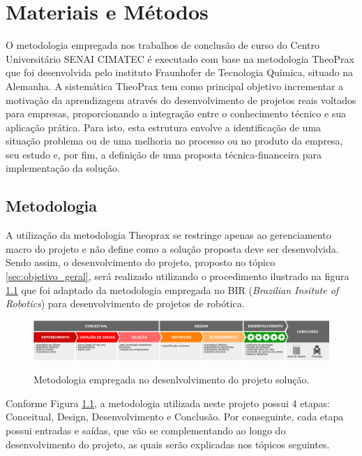 \chapter{Materiais e Métodos}
\label{chap:materiais_metodos}
O metodologia empregada nos trabalhos de conclusão de curso do Centro Universitário SENAI CIMATEC é executado com base na metodologia TheoPrax que foi desenvolvida pelo instituto Fraunhofer de Tecnologia Química, situado na Alemanha. A sistemática TheoPrax tem como principal objetivo incrementar a motivação da aprendizagem através do desenvolvimento de projetos reais voltados para empresas, proporcionando a integração entre o conhecimento técnico e sua aplicação prática. Para isto, esta estrutura envolve a identificação de uma situação problema ou de uma melhoria no processo ou no produto da empresa, seu estudo e, por fim, a definição de uma proposta técnica-financeira para implementação da solução.

\section{Metodologia}
\label{sec:metodologia}
A utilização da metodologia Theoprax se restringe apenas ao gerenciamento macro do projeto e não define como a solução proposta deve ser desenvolvida. Sendo assim, o desenvolvimento do projeto, proposto no tópico \ref{sec:objetivo_geral}, será realizado utilizando o procedimento ilustrado na figura \ref{fig:metodologia_diagrama} que foi adaptado da metodologia empregada no BIR (\textit{Brazilian Insitute of Robotics}) para desenvolvimento de projetos de robótica.

\begin{figure}[H]
	\centering
	\caption{Metodologia empregada no desenlvolvimento do projeto solução.}
	\includegraphics[width=1\textwidth]
	{Figures/metodologia_diagrama}
	\label{fig:metodologia_diagrama}
\end{figure}	

Conforme Figura \ref{fig:metodologia_diagrama}, a metodologia utilizada neste projeto possui 4 etapas: Conceitual, Design, Desenvolvimento e Conclusão. Por conseguinte, cada etapa possui entradas e saídas, que vão se complementando ao longo do desenvolvimento do projeto, as quais serão explicadas nos tópicos seguintes.

